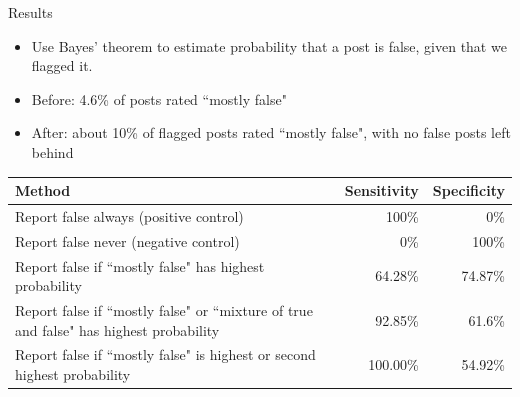 \documentclass[xcolor=dvipsnames, 14pt]{beamer}
\begin{document}
\begin{frame}{Results}
\small
\begin{itemize}
\item Use Bayes' theorem to estimate probability that a post is false, given that we flagged it.
\item Before: 4.6\% of posts rated ``mostly false"
\item After: about 10\% of flagged posts rated ``mostly false", with no false posts left behind
\end{itemize}
\scriptsize
\begin{center}
{\renewcommand{\arraystretch}{1.5}
\begin{tabular}{|| p{} | r | r ||}

\hline \hline
\textbf{Method} & \textbf{Sensitivity} & \textbf{Specificity} \\
\hline \hline

Report false always (positive control) & 100\% & 0\% \\ 
\hline
Report false never (negative control) & 0\% & 100\% \\
\hline
Report false if ``mostly false" has highest probability & 64.28\% & 74.87\% \\
\hline
Report false if ``mostly false" or ``mixture of true and false" has highest probability & 92.85\% & 61.6\% \\
\hline
Report false if ``mostly false" is highest or second highest probability & 100.00\% & 54.92\% \\


\hline \hline
\end{tabular}
}
\end{center}
\end{frame}
\end{document}
